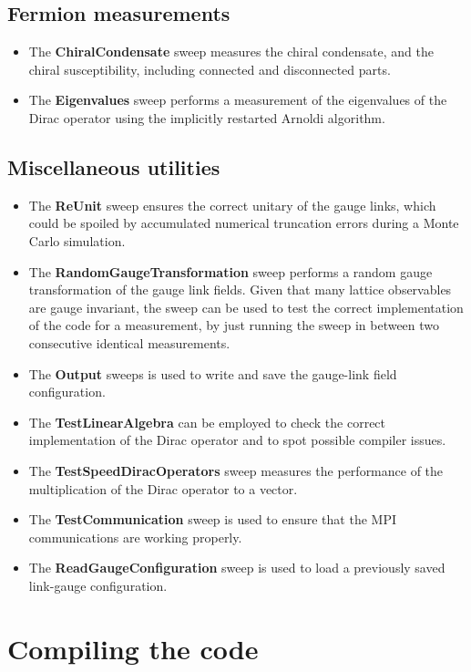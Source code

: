 \documentclass[11pt,a4paper]{article}
\begin{document}
\subsection{Fermion measurements}

\begin{itemize}
\item The \textbf{ChiralCondensate} sweep measures the chiral condensate, and the chiral susceptibility, including connected and disconnected parts.
\item The \textbf{Eigenvalues} sweep performs a measurement of the eigenvalues of the Dirac operator using the implicitly restarted Arnoldi algorithm.
\end{itemize}

\subsection{Miscellaneous utilities}

\begin{itemize}
\item The \textbf{ReUnit} sweep ensures the correct unitary of the gauge links, which could be spoiled by accumulated numerical truncation errors during a Monte Carlo simulation. 
\item The \textbf{RandomGaugeTransformation} sweep performs a random gauge transformation of the gauge link fields. Given that many lattice observables are gauge invariant, the sweep can be used to test the correct implementation of the code for a measurement, by just running the sweep in between two consecutive identical measurements.
\item The \textbf{Output} sweeps is used to write and save the gauge-link field configuration.
\item The \textbf{TestLinearAlgebra} can be employed to check the correct implementation of the Dirac operator and to spot possible compiler issues.
\item The \textbf{TestSpeedDiracOperators} sweep measures the performance of the multiplication of the Dirac operator to a vector.
\item The \textbf{TestCommunication} sweep is used to ensure that the MPI communications are working properly.
\item The \textbf{ReadGaugeConfiguration} sweep is used to load a previously saved link-gauge configuration.
\end{itemize}

\section{Compiling the code}
\end{document}
